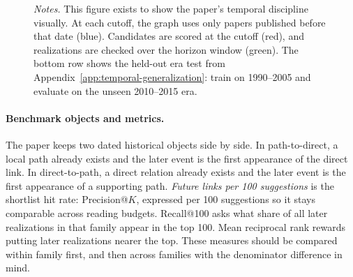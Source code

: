 \documentclass[11pt]{article}
\newcommand{\fignotes}[1]{\caption*{\textit{Notes.} #1}}
\begin{document}
\begin{figure}[p]
{{
  }
  }
  \fignotes{This figure exists to show the paper's temporal discipline visually. At each cutoff, the graph uses only papers published before that date (blue). Candidates are scored at the cutoff (red), and realizations are checked over the horizon window (green). The bottom row shows the held-out era test from Appendix~\ref{app:temporal-generalization}: train on 1990--2005 and evaluate on the unseen 2010--2015 era.}
\end{figure}

\paragraph{Benchmark objects and metrics.}
The paper keeps two dated historical objects side by side. In path-to-direct, a local path
already exists and the later event is the first appearance of the direct link. In
direct-to-path, a direct relation already exists and the later event is the first appearance
of a supporting path. \emph{Future links per 100 suggestions} is the shortlist hit rate:
Precision@\(K\), expressed per 100 suggestions so it stays comparable across reading
budgets. Recall@100 asks what share of all later realizations in that family appear in the
top 100. Mean reciprocal rank rewards putting later realizations nearer the top. These
measures should be compared within family first, and then across families with the
denominator difference in mind.
\end{document}
